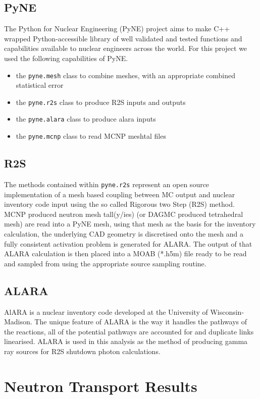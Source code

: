 \documentclass[12pt]{article}
\begin{document}
\subsection{PyNE}
The Python for Nuclear Engineering (PyNE) \cite{Scopatz2012b} project aims to make C++ wrapped Python-accessible library of well validated and tested functions and capabilities available to nuclear engineers across the world. For this project we used the following capabilities of PyNE.
\begin{itemize}
  \item{the \texttt{pyne.mesh} class to combine meshes, with an appropriate combined statistical error}
  \item{the \texttt{pyne.r2s} class to produce R2S inputs and outputs}
  \item{the \texttt{pyne.alara} class to produce alara inputs}
  \item{the \texttt{pyne.mcnp} class to read MCNP meshtal files}
\end{itemize}
\subsection{R2S}
The methods contained within \texttt{pyne.r2s} \cite{pyne_r2s} represent an open source implementation of a mesh based coupling between MC output and nuclear inventory code input using the so called Rigorous two Step (R2S) \cite{Chen2002107} method. MCNP produced neutron mesh tall(y/ies) (or DAGMC produced tetrahedral mesh) are read into a PyNE mesh, using that mesh as the basis for the inventory calculation, the underlying CAD geometry is discretised onto the mesh and a fully consistent activation problem is generated for ALARA. The output of that ALARA calculation is then placed into a MOAB (*.h5m) file ready to be read and sampled from using the appropriate source sampling routine.
\subsection{ALARA}
AlARA \cite{alara} is a nuclear inventory code developed at the University of Wisconsin-Madison. The unique feature of ALARA is the way it handles the pathways of the reactions, all of the potential pathways are accounted for and duplicate links linearised. ALARA is used in this analysis as the method of producing gamma ray sources for R2S shutdown photon calculations.
\newpage
\section{Neutron Transport Results}
\end{document}
